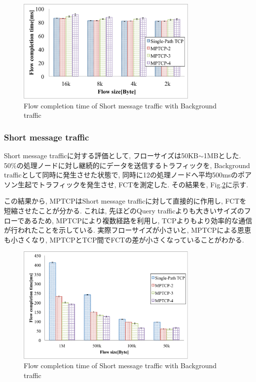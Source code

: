 \begin{figure}[t]
    \begin{center}
    \includegraphics[autoebb, width=250pt]{./img/mix_query.pdf}
    \caption{ Flow completion time  of Short message traffic with Background
    traffic}
    \label{fig:mix_query}
    \end{center}
\end{figure}

\subsubsection{Short message traffic}
Short message trafficに対する評価として, フローサイズは50KB$\sim$1MBとした.
50\%の処理ノードに対し継続的にデータを送信するトラフィックを, Background trafficとして同時に発生させた状態で,
同時に12の処理ノードへ平均500msのポアソン生起でトラフィックを発生させ, FCTを測定した.
その結果を, Fig.\ref{fig:short_query}に示す.

この結果から, MPTCPはShort message trafficに対して直接的に作用し, FCTを短縮させたことが分かる.
これは, 先ほどのQuery trafficよりも大きいサイズのフローであるため, MPTCPにより複数経路を利用し,
TCPよりもより効率的な通信が行われたことを示している. 
実際フローサイズが小さいと, MPTCPによる恩恵も小さくなり, MPTCPとTCP間でFCTの差が小さくなっていることがわかる. 

\begin{figure}[t]
    \begin{center}
    \includegraphics[autoebb, width=250pt]{./img/mix_short.pdf}
    \caption{ Flow completion time  of Short message traffic with Background
    traffic}
    \label{fig:short_query}
    \end{center}
\end{figure}

